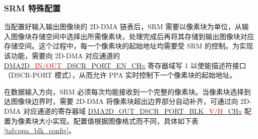 \documentclass[main\_\_CN.tex]{subfiles}
\begin{document}
\subsubsection{SRM 特殊配置}
当配置好输入输出图像块的 2D-DMA 链表后，SRM 需要以像素块为单位，从输入图像块存储空间中选择出所需像素块，处理完成后再将其存储到输出图像块对应存储空间。这个过程中，每一个像素块的起始地址均需要受 SRM 的控制。为实现该功能，需要向 2D-DMA 对应通道的 \hyperref[fielddesc:DMA2DINDSCRPORTENCHN]{DMA2D\_\textcolor{red}{IN/OUT}\_DSCR\_PORT\_EN\_CH\textcolor{red}{x}} 寄存器域写 1 以使能描述符接口（DSCR-PORT 模式），从而允许 PPA 实时控制下一个像素块的起始地址。

在数据输入方向，SRM 必须每次均能接收到一个完整的像素块。当像素块选择到达图像块边界时，需要 2D-DMA 将像素块超出边界部分自动补齐，可通过向 2D-DMA 对应通道的寄存器域 \hyperref[fielddesc:DMA2DOUTDSCRPORTBLKHCHN]{DMA2D\_OUT\_DSCR\_PORT\_BLK\_\textcolor{red}{V/H}\_CH\textcolor{red}{x}} 配置为像素块大小实现。配置值根据图像格式而不同，具体如下表 \ref{tab:ppa_blk_config}。
\end{document}
